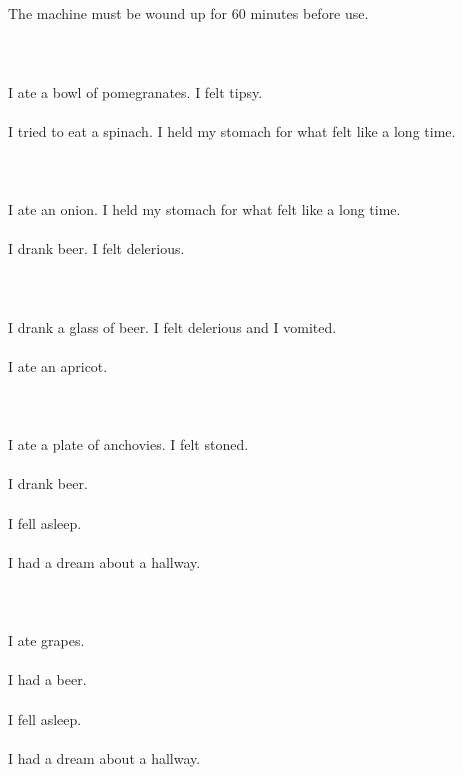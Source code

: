 \documentclass{article}
\begin{document}
    \section{}
    The machine must be wound up for 60 minutes before use.\\\\ 
    \newpage
    
    \section{}
    I ate a bowl of pomegranates. I felt tipsy.\\\\I tried to eat a spinach. I held my stomach for what felt like a long time.\\\\ 
    \newpage
    
    \section{}
    I ate an onion. I held my stomach for what felt like a long time.\\\\I drank beer. I felt delerious.\\\\ 
    \newpage
    
    \section{}
    I drank a glass of beer. I felt delerious and I vomited.\\\\I ate an apricot.\\\\ 
    \newpage
    
    \section{}
    I ate a plate of anchovies. I felt stoned.\\\\I drank beer.\\\\I fell asleep.\\\\I had a dream about a hallway.\\\\ 
    \newpage
    
    \section{}
    I ate grapes.\\\\I had a beer.\\\\I fell asleep.\\\\I had a dream about a hallway.\\\\ 
    \newpage
    
\end{document}
